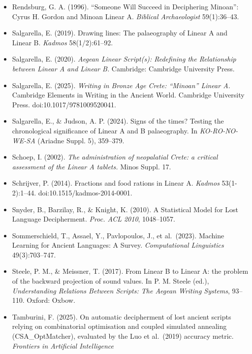 \documentclass[
  10pt,
]{article}
\begin{document}
\begin{itemize}
  Ravi, S., \& Knight, K. (2008). Attacking Decipherment Problems
  Optimally with Low-Order N-gram Models. \emph{Proc. EMNLP 2008},
  812--819. (Cited in §8.3: decipherment accuracy vs.~ciphertext length
  --- a data-size recovery curve.)
\item
  Rendsburg, G. A. (1996). ``Someone Will Succeed in Deciphering
  Minoan'': Cyrus H. Gordon and Minoan Linear A. \emph{Biblical
  Archaeologist} 59(1):36--43.
\item
  Salgarella, E. (2019). Drawing lines: The palaeography of Linear A and
  Linear B. \emph{Kadmos} 58(1/2):61--92.
\item
  Salgarella, E. (2020). \emph{Aegean Linear Script(s): Redefining the
  Relationship between Linear A and Linear B.} Cambridge: Cambridge
  University Press.
\item
  Salgarella, E. (2025). \emph{Writing in Bronze Age Crete: ``Minoan''
  Linear A.} Cambridge Elements in Writing in the Ancient World.
  Cambridge University Press. doi:10.1017/9781009520041.
\item
  Salgarella, E., \& Judson, A. P. (2024). Signs of the times? Testing
  the chronological significance of Linear A and B palaeography. In
  \emph{KO-RO-NO-WE-SA} (Ariadne Suppl. 5), 359--379.
\item
  Schoep, I. (2002). \emph{The administration of neopalatial Crete: a
  critical assessment of the Linear A tablets.} Minos Suppl. 17.
\item
  Schrijver, P. (2014). Fractions and food rations in Linear A.
  \emph{Kadmos} 53(1-2):1--44. doi:10.1515/kadmos-2014-0001.
\item
  Snyder, B., Barzilay, R., \& Knight, K. (2010). A Statistical Model
  for Lost Language Decipherment. \emph{Proc. ACL 2010}, 1048--1057.
\item
  Sommerschield, T., Assael, Y., Pavlopoulos, J., et al.~(2023). Machine
  Learning for Ancient Languages: A Survey. \emph{Computational
  Linguistics} 49(3):703--747.
\item
  Steele, P. M., \& Meissner, T. (2017). From Linear B to Linear A: the
  problem of the backward projection of sound values. In P. M. Steele
  (ed.), \emph{Understanding Relations Between Scripts: The Aegean
  Writing Systems}, 93--110. Oxford: Oxbow.
\item
  Tamburini, F. (2025). On automatic decipherment of lost ancient
  scripts relying on combinatorial optimisation and coupled simulated
  annealing (CSA\_OptMatcher), evaluated by the Luo et al.~(2019)
  accuracy metric. \emph{Frontiers in Artificial Intelligence}

\end{itemize}
\end{document}
